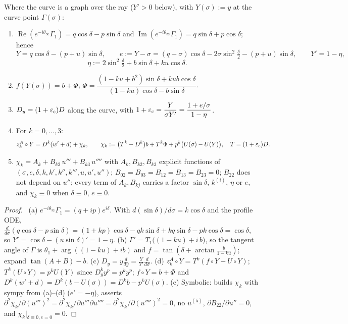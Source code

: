 \begin{lemma}\label{C:lem:id}
Where the curve is a graph over the ray ($Y'>0$ below), with $Y(\sigma):=y$ at the curve point $\Gamma(\sigma)$:
\begin{enumerate}
\item[(a)] $\operatorname{Re}(e^{-i\theta_\infty}\Gamma_1)=q\cos\delta-p\sin\delta$ and $\operatorname{Im}(e^{-i\theta_\infty}\Gamma_1)=q\sin\delta+p\cos\delta$; hence
\[Y=q\cos\delta-(p+u)\sin\delta,\qquad e:=Y-\sigma=(q-\sigma)\cos\delta-2\sigma\sin^2\tfrac\delta2-(p+u)\sin\delta,\qquad Y'=1-\eta,\]
\[\eta:=2\sin^2\tfrac\delta2+b\sin\delta+ku\cos\delta .\]
\item[(b)] $f(Y(\sigma))=b+\Phi$, \qquad $\Phi=\dfrac{(1-ku+b^2)\sin\delta+kub\cos\delta}{(1-ku)\cos\delta-b\sin\delta}$.
\item[(c)] $D_y=(1+\varepsilon_{\rm c})D$ along the curve, with $1+\varepsilon_{\rm c}=\dfrac{Y}{\sigma Y'}=\dfrac{1+e/\sigma}{1-\eta}$.
\item[(d)] For $k=0,\dots,3$:
\[
z^A_k\circ Y=D^k(w'+d)+\chi_k,\qquad \chi_k:=\bigl(T^k-D^k\bigr)b+T^k\Phi+p^k\bigl(U(\sigma)-U(Y)\bigr),\quad T=(1+\varepsilon_{\rm c})D .
\]
\item[(e)] $\chi_k=A_k+B_{k2}\,u'''+B_{k3}\,u''''$ with $A_k,B_{k2},B_{k3}$ explicit functions of $(\sigma,e,\delta,k,k',k'',k''',u,u',u'')$; $B_{02}=B_{03}=B_{12}=B_{13}=B_{23}=0$; $B_{22}$ does not depend on $u''$; every term of $A_k,B_{kj}$ carries a factor $\sin\delta$, $k^{(i)}$, $\eta$ or $e$, and $\chi_k\equiv0$ when $\delta\equiv0$, $e\equiv0$.
\end{enumerate}
\end{lemma}

\begin{proof}\tP\ (a) $e^{-i\theta_\infty}\Gamma_1=(q+ip)e^{i\delta}$. With $d(\sin\delta)/d\sigma=k\cos\delta$ and the profile ODE, $\frac{d}{d\sigma}(q\cos\delta-p\sin\delta)=(1+kp)\cos\delta-qk\sin\delta+kq\sin\delta-pk\cos\delta=\cos\delta$, so $Y'=\cos\delta-(u\sin\delta)'=1-\eta$. (b) $\Gamma'=T_1\bigl((1-ku)+i\,b\bigr)$, so the tangent angle of $\Gamma$ is $\theta_1+\arg((1-ku)+ib)$ and $f=\tan(\delta+\arctan\frac b{1-ku})$; expand $\tan(A+B)-b$. (c) $D_y=y\frac d{dy}=\frac{Y}{Y'}\frac d{d\sigma}$. (d) $z^A_k\circ Y=T^k(f\circ Y-U\circ Y)$; $T^k(U\circ Y)=p^kU(Y)$ since $D_y^ky^p=p^ky^p$; $f\circ Y=b+\Phi$ and $D^k(w'+d)=D^k(b-U(\sigma))=D^kb-p^kU(\sigma)$. (e) Symbolic:  builds $\chi_k$ with sympy from (a)--(d) ($e'=-\eta$), asserts $\partial^2\chi_k/\partial(u''')^2=\partial^2\chi_k/\partial u'''\partial u''''=\partial^2\chi_k/\partial(u'''')^2=0$, no $u^{(5)}$, $\partial B_{22}/\partial u''=0$, and $\chi_k|_{\delta\equiv0,e=0}=0$.
\end{proof}

